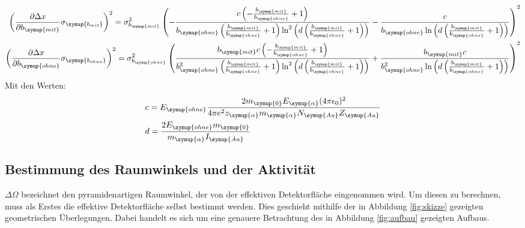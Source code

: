 \begin{align*}
  \left(\frac{\partial \Delta x}{\partial b_{\symup{mit}}}\sigma_{\symup{b_{mit}}}\right)^2 = \sigma_{b_{\symup{mit}}}^{2} \left(- \frac{c \left(- \frac{b_{\symup{mit}}}{b_{\symup{ohne}}} + 1\right)}{b_{\symup{ohne}} \left(\frac{b_{\symup{mit}}}{b_{\symup{ohne}}} + 1\right) \ln^{2}{\left (d \left(\frac{b_{\symup{mit}}}{b_{\symup{ohne}}} + 1\right) \right )}} - \frac{c}{b_{\symup{ohne}} \ln{\left (d \left(\frac{b_{\symup{mit}}}{b_{\symup{ohne}}} + 1\right) \right )}}\right)^{2} \\
  \left(\frac{\partial \Delta x}{\partial b_{\symup{ohne}}}\sigma_{\symup{b_{ohne}}}\right)^2 = \sigma_{b_{\symup{ohne}}}^{2} \left(\frac{b_{\symup{mit}} c \left(- \frac{b_{\symup{mit}}}{b_{\symup{ohne}}} + 1\right)}{b_{\symup{ohne}}^{2} \left(\frac{b_{\symup{mit}}}{b_{\symup{ohne}}} + 1\right) \ln^{2}{\left (d \left(\frac{b_{\symup{mit}}}{b_{\symup{ohne}}} + 1\right) \right )}} + \frac{b_{\symup{mit}} c}{b_{\symup{ohne}}^{2} \ln{\left (d \left(\frac{b_{\symup{mit}}}{b_{\symup{ohne}}} + 1\right) \right )}}\right)^{2}
\end{align*}
Mit den Werten:
\begin{align*}
  &c =  E_{\symup{ohne}} \frac{2 m_{\symup{0}} E_{\symup{\alpha}} (4 \pi \epsilon_0)^2}{4 \pi e^2 z_{\symup{\alpha}}  m_{\symup{\alpha}} N_{\symup{Au}} Z_{\symup{Au}}} \\
  &d = \frac{2 E_{\symup{ohne}} m_{\symup{0}}}{m_{\symup{\alpha}} I_{\symup{Au}}}
\end{align*}

\subsection{Bestimmung des Raumwinkels und der Aktivität}

$\Delta \Omega$ bezeichnet den pyramidenartigen Raumwinkel, der von
der effektiven Detektorfläche eingenommen wird. Um diesen zu berechnen, muss
als Erstes die effektive Detektorfläche selbst bestimmt werden. Dies geschieht
mithilfe der in Abbildung \ref{fig:skizze} gezeigten geometrischen Überlegungen.
Dabei handelt es sich um eine genauere Betrachtung des in Abbildung \ref{fig:aufbau}
gezeigten Aufbaus.

